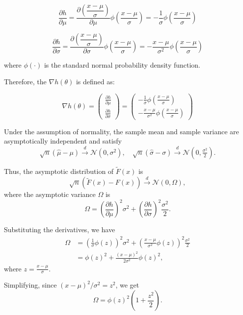 \documentclass{article}
\begin{document}
$$
\frac{\partial h}{\partial \mu} = \dfrac{\partial \left(\dfrac{x - \mu}{\sigma}\right)}{\partial \mu} \phi \left(\dfrac{x - \mu}{\sigma}\right) = -\frac{1}{\sigma} \phi\left( \frac{x - \mu}{\sigma} \right)
$$

$$
\frac{\partial h}{\partial \sigma} = \dfrac{\partial \left(\dfrac{x - \mu}{\sigma}\right)}{\partial \sigma} \phi \left(\dfrac{x - \mu}{\sigma}\right) = -\frac{x - \mu}{\sigma^2} \phi\left( \frac{x - \mu}{\sigma} \right)
$$

where \( \phi(\cdot) \) is the standard normal probability density function.

Therefore, the \( \nabla h(\theta) \) is defined as:

\[
\nabla h(\theta) = \begin{pmatrix}
\displaystyle \frac{\partial h}{\partial \mu} \\[2ex]
\displaystyle \frac{\partial h}{\partial \sigma}
\end{pmatrix} = \begin{pmatrix}
\displaystyle -\frac{1}{\sigma} \phi\left( \frac{x - \mu}{\sigma} \right) \\[2ex]
\displaystyle -\frac{x - \mu}{\sigma^2} \phi\left( \frac{x - \mu}{\sigma} \right)
\end{pmatrix}
\]

Under the assumption of normality, the sample mean and sample variance are asymptotically independent and satisfy
\[
\sqrt{n} (\hat{\mu} - \mu) \xrightarrow{d} \mathcal{N}\left( 0, \sigma^2 \right), \quad
\sqrt{n} (\hat{\sigma} - \sigma) \xrightarrow{d} \mathcal{N}\left( 0, \tfrac{\sigma^2}{2} \right).
\]

Thus, the asymptotic distribution of \( \tilde{F}(x) \) is
\[
\sqrt{n} \left( \tilde{F}(x) - F(x) \right) \xrightarrow{d} \mathcal{N}\left( 0, \Omega \right),
\]
where the asymptotic variance \( \Omega \) is
\[
\Omega = \left( \frac{\partial h}{\partial \mu} \right)^2 \sigma^2 + \left( \frac{\partial h}{\partial \sigma} \right)^2 \frac{\sigma^2}{2}.
\]

Substituting the derivatives, we have
\[
\begin{aligned}
\Omega &= \left( \frac{1}{\sigma} \phi(z) \right)^2 \sigma^2 + \left( \frac{x - \mu}{\sigma^2} \phi(z) \right)^2 \frac{\sigma^2}{2} \\
&= \phi(z)^2 + \frac{(x - \mu)^2}{2 \sigma^2} \phi(z)^2,
\end{aligned}
\]
where \( z = \frac{x - \mu}{\sigma} \).

Simplifying, since \( (x - \mu)^2 / \sigma^2 = z^2 \), we get
\[
\Omega = \phi(z)^2 \left( 1 + \frac{z^2}{2} \right).
\]
\end{document}
